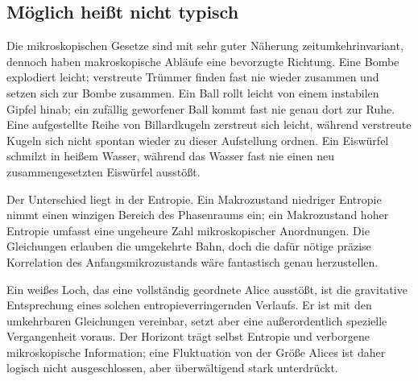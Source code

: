 \subsection{Möglich heißt nicht typisch}

Die mikroskopischen Gesetze sind mit sehr guter Näherung zeitumkehrinvariant, dennoch haben makroskopische Abläufe eine bevorzugte Richtung. Eine Bombe explodiert leicht; verstreute Trümmer finden fast nie wieder zusammen und setzen sich zur Bombe zusammen. Ein Ball rollt leicht von einem instabilen Gipfel hinab; ein zufällig geworfener Ball kommt fast nie genau dort zur Ruhe. Eine aufgestellte Reihe von Billardkugeln zerstreut sich leicht, während verstreute Kugeln sich nicht spontan wieder zu dieser Aufstellung ordnen. Ein Eiswürfel schmilzt in heißem Wasser, während das Wasser fast nie einen neu zusammengesetzten Eiswürfel ausstößt.

Der Unterschied liegt in der Entropie. Ein Makrozustand niedriger Entropie nimmt einen winzigen Bereich des Phasenraums ein; ein Makrozustand hoher Entropie umfasst eine ungeheure Zahl mikroskopischer Anordnungen. Die Gleichungen erlauben die umgekehrte Bahn, doch die dafür nötige präzise Korrelation des Anfangsmikrozustands wäre fantastisch genau herzustellen.

\begin{classroomqa}
\end{classroomqa}

Ein weißes Loch, das eine vollständig geordnete Alice ausstößt, ist die gravitative Entsprechung eines solchen entropieverringernden Verlaufs. Er ist mit den umkehrbaren Gleichungen vereinbar, setzt aber eine außerordentlich spezielle Vergangenheit voraus. Der Horizont trägt selbst Entropie und verborgene mikroskopische Information; eine Fluktuation von der Größe Alices ist daher logisch nicht ausgeschlossen, aber überwältigend stark unterdrückt.

\begin{classroomqa}
\end{classroomqa}

